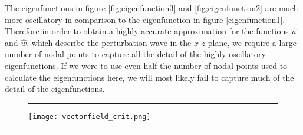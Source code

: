 \documentclass[a4paper, 12pt, twoside, openright]{article}
\numberwithin{equation}{section}
\begin{document}
The eigenfunctions in figure \ref{fig;eigenfunction3} and \ref{fig;eigenfunction2} are much more oscillatory in comparison to the eigenfunction in figure \ref{eigenfunction1}. Therefore in order to obtain a highly accurate approximation for the functions $\hat u$ and $\hat w$, which describe the perturbation wave in the $x$-$z$ plane, we require a large number of nodal points to capture all the detail of the highly oscillatory eigenfunctions. If we were to use even half the number of nodal points used to calculate the eigenfunctions here, we will most likely fail to capture much of the detail of the eigenfunctions.%

\begin{figure}[H]
\centering
\rule{\linewidth}{1.5pt}
\texttt{[image: vectorfield\_crit.png]}
\rule{\linewidth}{1.5pt}
\end{figure}
%
\end{document}
